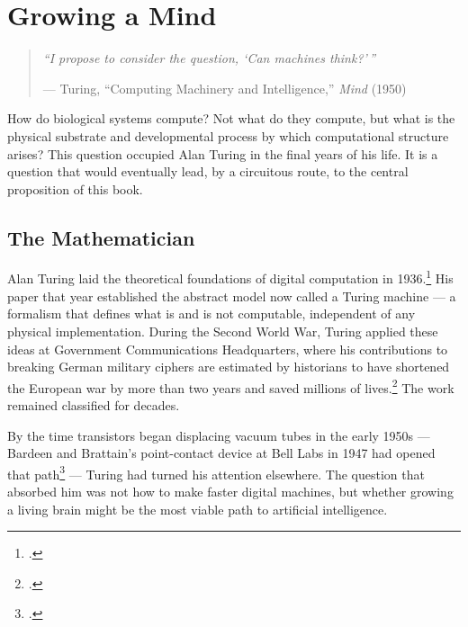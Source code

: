 
\chapter{Growing a Mind}
\label{spine:growing-a-mind}


\begin{quote}\small\textit{%
``I propose to consider the question, `Can machines think?'\,''%
}\par\raggedleft --- Turing, ``Computing Machinery and Intelligence,'' \textit{Mind} (1950)\end{quote}
\vspace{0.5cm}


How do biological systems compute?  Not what do they compute, but what is the physical substrate and developmental process by which computational structure arises?  This question occupied Alan Turing in the final years of his life. It is a question that would eventually lead, by a circuitous route, to the central proposition of this book.

\section*{The Mathematician}

Alan Turing laid the theoretical foundations of digital computation in 1936.\footcite{turing1936} His paper that year established the abstract model now called a Turing machine --- a formalism that defines what is and is not computable, independent of any physical implementation. During the Second World War, Turing applied these ideas at Government Communications Headquarters, where his contributions to breaking German military ciphers are estimated by historians to have shortened the European war by more than two years and saved millions of lives.\footcite{winterbotham1974} The work remained classified for decades.

By the time transistors began displacing vacuum tubes in the early 1950s --- Bardeen and Brattain's point-contact device at Bell Labs in 1947 had opened that path\footcite{bardeen1948} --- Turing had turned his attention elsewhere. The question that absorbed him was not how to make faster digital machines, but whether growing a living brain might be the most viable path to artificial intelligence.

